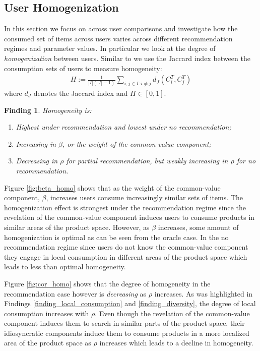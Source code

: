 \documentclass[sigconf, anonymous, review]{acmart}
\newtheorem{finding}{Finding}
\begin{document}
\subsection{User Homogenization}
In this section we focus on across user comparisons and investigate how the consumed set of items across users varies across different recommendation regimes and parameter values. In particular we look at the degree of \textit{homogenization} between users. Similar to \cite{chaney2018algorithmic} we use the Jaccard index between the consumption sets of users to measure homogeneity:
\begin{align*}
H:=\frac{1}{|I|(|I|-1)}\sum_{i,j \in I: i \ne j}d_J(C_i^T,C_j^T)
\end{align*}
where $d_J$ denotes the Jaccard index and $H \in [0,1]$.
\begin{finding}\label{finding_homogeneity}
Homogeneity is:
\begin{enumerate}
\item Highest under recommendation and lowest under no recommendation;
\item Increasing in $\beta$, or the weight of the common-value component;
\item Decreasing in $\rho$ for partial recommendation, but weakly increasing in $\rho$ for no recommendation.
\end{enumerate}
\end{finding}
Figure \ref{fig:beta_homo} shows that as the weight of the common-value component, $\beta$, increases users consume increasingly similar sets of items. The homogenization effect is strongest under the recommendation regime since the revelation of the common-value component induces users to consume products in similar areas of the product space. However, as $\beta$ increases, some amount of homogenization is optimal as can be seen from the oracle case. In the no recommendation regime since users do not know the common-value component they engage in local consumption in different areas of the product space which leads to less than optimal homogeneity.
\par

Figure \ref{fig:cor_homo} shows that the degree of homogeneity in the recommendation case however is \textit{decreasing} as $\rho$ increases. As was highlighted in Findings \ref{finding_local_consumption} and \ref{finding_diversity}, the degree of local consumption increases with $\rho$. Even though the revelation of the common-value component induces them to search in similar parts of the product space, their idiosyncratic components induce them to consume products in a more localized area of the product space as $\rho$ increases which leads to a decline in homogeneity.
\end{document}
